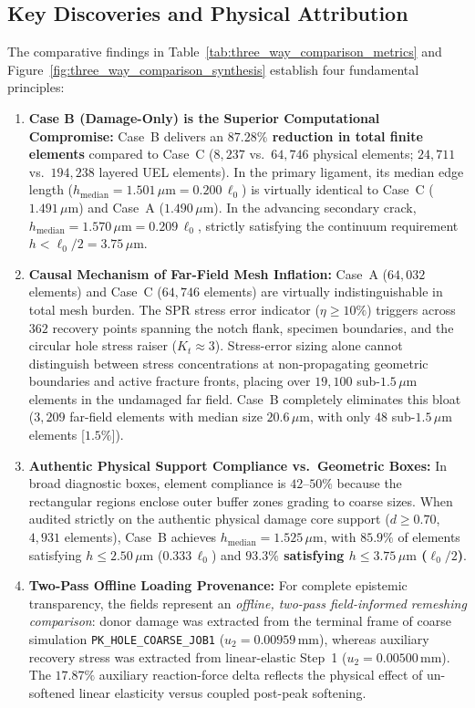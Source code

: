 \subsection{Key Discoveries and Physical Attribution}
The comparative findings in Table~\ref{tab:three_way_comparison_metrics} and Figure~\ref{fig:three_way_comparison_synthesis} establish four fundamental principles:
\begin{enumerate}
  \item \textbf{Case B (Damage-Only) is the Superior Computational Compromise:} Case~B delivers an \textbf{$87.28\%$ reduction in total finite elements} compared to Case~C ($8{,}237$ vs.\ $64{,}746$ physical elements; $24{,}711$ vs.\ $194{,}238$ layered UEL elements). In the primary ligament, its median edge length ($h_{\text{median}} = 1.501\,\mu\mathrm{m} = 0.200\,\ell_0$) is virtually identical to Case~C ($1.491\,\mu\mathrm{m}$) and Case~A ($1.490\,\mu\mathrm{m}$). In the advancing secondary crack, $h_{\text{median}} = 1.570\,\mu\mathrm{m} = 0.209\,\ell_0$, strictly satisfying the continuum requirement $h < \ell_0 / 2 = 3.75\,\mu\mathrm{m}$.
  \item \textbf{Causal Mechanism of Far-Field Mesh Inflation:} Case~A ($64{,}032$ elements) and Case~C ($64{,}746$ elements) are virtually indistinguishable in total mesh burden. The SPR stress error indicator ($\eta \ge 10\%$) triggers across $362$ recovery points spanning the notch flank, specimen boundaries, and the circular hole stress raiser ($K_t \approx 3$). Stress-error sizing alone cannot distinguish between stress concentrations at non-propagating geometric boundaries and active fracture fronts, placing over $19{,}100$ sub-$1.5\,\mu\mathrm{m}$ elements in the undamaged far field. Case~B completely eliminates this bloat ($3{,}209$ far-field elements with median size $20.6\,\mu\mathrm{m}$, with only $48$ sub-$1.5\,\mu\mathrm{m}$ elements [$1.5\%$]).
  \item \textbf{Authentic Physical Support Compliance vs.\ Geometric Boxes:} In broad diagnostic boxes, element compliance is $42\text{--}50\%$ because the rectangular regions enclose outer buffer zones grading to coarse sizes. When audited strictly on the authentic physical damage core support ($d \ge 0.70$, $4{,}931$ elements), Case~B achieves $h_{\text{median}} = 1.525\,\mu\mathrm{m}$, with $85.9\%$ of elements satisfying $h \le 2.50\,\mu\mathrm{m}$ ($0.333\,\ell_0$) and \textbf{$93.3\%$ satisfying $h \le 3.75\,\mu\mathrm{m}$ ($\ell_0/2$)}.
  \item \textbf{Two-Pass Offline Loading Provenance:} For complete epistemic transparency, the fields represent an \emph{offline, two-pass field-informed remeshing comparison}: donor damage was extracted from the terminal frame of coarse simulation \texttt{PK\_HOLE\_COARSE\_JOB1} ($u_2 = 0.00959\,\mathrm{mm}$), whereas auxiliary recovery stress was extracted from linear-elastic Step~1 ($u_2 = 0.00500\,\mathrm{mm}$). The $17.87\%$ auxiliary reaction-force delta reflects the physical effect of un-softened linear elasticity versus coupled post-peak softening.
\end{enumerate}

